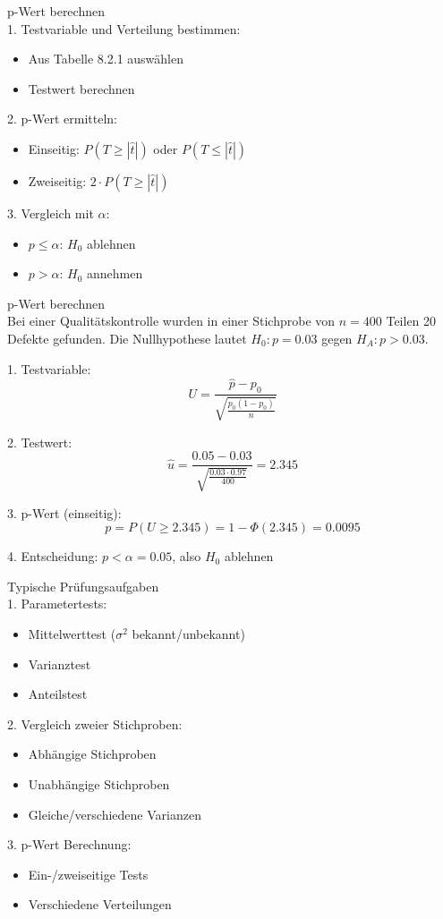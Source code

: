 \begin{KR}{p-Wert berechnen}\\
1. Testvariable und Verteilung bestimmen:
   \begin{itemize}
     \item Aus Tabelle 8.2.1 auswählen
     \item Testwert berechnen
   \end{itemize}

2. p-Wert ermitteln:
   \begin{itemize}
     \item Einseitig: $P(T \geq |\hat{t}|)$ oder $P(T \leq |\hat{t}|)$
     \item Zweiseitig: $2 \cdot P(T \geq |\hat{t}|)$
   \end{itemize}

3. Vergleich mit $\alpha$:
   \begin{itemize}
     \item $p \leq \alpha$: $H_0$ ablehnen
     \item $p > \alpha$: $H_0$ annehmen
   \end{itemize}
\end{KR}

\begin{example2}{p-Wert berechnen}\\
Bei einer Qualitätskontrolle wurden in einer Stichprobe von $n=400$ Teilen 20 Defekte gefunden. Die Nullhypothese lautet $H_0: p = 0.03$ gegen $H_A: p > 0.03$.

1. Testvariable:
   $$U = \frac{\hat{p}-p_0}{\sqrt{\frac{p_0(1-p_0)}{n}}}$$

2. Testwert:
   $$\hat{u} = \frac{0.05-0.03}{\sqrt{\frac{0.03 \cdot 0.97}{400}}} = 2.345$$

3. p-Wert (einseitig):
   $$p = P(U \geq 2.345) = 1 - \Phi(2.345) = 0.0095$$

4. Entscheidung: $p < \alpha = 0.05$, also $H_0$ ablehnen
\end{example2}

\begin{KR}{Typische Prüfungsaufgaben}\\
1. Parametertests:
   \begin{itemize}
     \item Mittelwerttest ($\sigma^2$ bekannt/unbekannt)
     \item Varianztest
     \item Anteilstest
   \end{itemize}

2. Vergleich zweier Stichproben:
   \begin{itemize}
     \item Abhängige Stichproben
     \item Unabhängige Stichproben
     \item Gleiche/verschiedene Varianzen
   \end{itemize}

3. p-Wert Berechnung:
   \begin{itemize}
     \item Ein-/zweiseitige Tests
     \item Verschiedene Verteilungen
   \end{itemize}
\end{KR}

